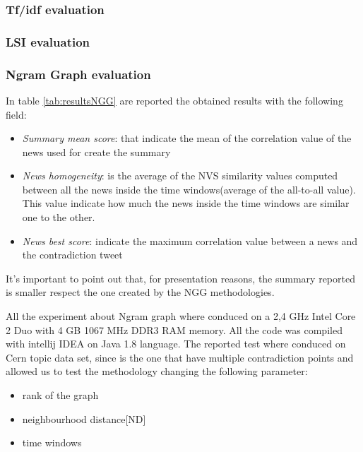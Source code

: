 \subsubsection*{Tf/idf evaluation}


\subsubsection*{LSI evaluation}




\subsubsection*{Ngram Graph evaluation}
In table \ref{tab:resultsNGG} are reported the obtained results with the following field:
\begin{itemize}
	\item \emph{Summary mean score}: that indicate the mean of the correlation value of the news used for create the summary
	\item \emph{News homogeneity}: is the average of the NVS similarity values computed between all the news inside the time windows(average of the all-to-all value). This value indicate how much the news inside the time windows are similar one to the other.
	\item \emph{News best score}: indicate the maximum correlation value between a news and the contradiction tweet
\end{itemize}
It's important to point out that, for presentation reasons, the summary reported is smaller respect the one created by the NGG methodologies.











All the experiment about Ngram graph where conduced on a 2,4 GHz Intel Core 2 Duo with 4 GB 1067 MHz DDR3 RAM memory.
 All the code was compiled with intellij IDEA on Java 1.8 language. 
The reported test where conduced on Cern topic data set, since is the one that have multiple contradiction points and allowed us to test the methodology changing the following parameter:
\begin{itemize}
	\item rank of the graph
	\item neighbourhood distance[ND]
	\item time windows
\end{itemize}

